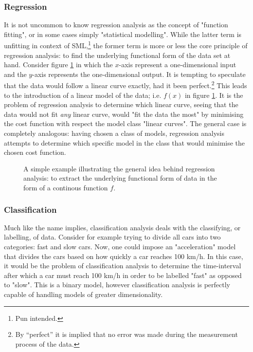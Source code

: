 \documentclass[nofootinbib,reprint,english]{revtex4-1}
\begin{document}
\subsubsection{Regression}
It is not uncommon to know regression analysis as the concept of "function fitting", or in some cases simply "statistical modelling". While the latter term is unfitting in context of SML,\footnote{Pun intended.} the former term is more or less the core principle of regression analysis: to find the underlying functional form of the data set at hand. Consider figure \ref{fig:regression_example} in which the \(x\)-axis represent a one-dimensional input and the \(y\)-axis represents the one-dimensional output. It is tempting to speculate that the data would follow a linear curve exactly, had it been perfect.\footnote{By ``perfect'' it is implied that no error was made during the measurement process of the data.} This leads to the introduction of a linear model of the data; i.e. \(f(x)\) in figure \ref{fig:regression_example}. It is the problem of regression analysis to determine which linear curve, seeing that the data would not fit \emph{any} linear curve, would "fit the data the most" by minimising the cost function with respect the model class "linear curves". The general case is completely analogous: having chosen a class of models, regression analysis attempts to determine which specific model in the class that would minimise the chosen cost function.
\begin{figure}
\centering
{}
\caption{A simple example illustrating the general idea behind regression analysis: to extract the underlying functional form of data in the form of a continous function \(f\).}\label{fig:regression_example}
\end{figure}

\subsubsection{Classification}
Much like the name implies, classification analysis deals with the classifying, or labelling, of data. Consider for example trying to divide all cars into two categories: fast and slow cars. Now, one could impose an "acceleration" model that divides the cars based on how quickly a car reaches 100 km/h. In this case, it would be the problem of classification analysis to determine the time-interval after which a car must reach 100 km/h in order to be labelled "fast" as opposed to "slow". This is a binary model, however classification analysis is perfectly capable of handling models of greater dimensionality.
\end{document}
